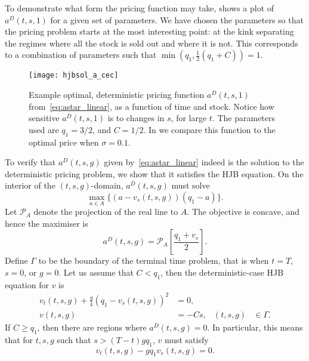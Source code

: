 \documentclass[main.tex]{subfiles}
\begin{document}
\begin{example}\label{ex:acecplot}
  To demonstrate what form the pricing function may take,
   shows a plot of $a^D(t,s,1)$ for a given set of
  parameters. We have chosen the parameters so that the pricing
  problem starts at the most interesting point: at the kink separating
  the regimes where all the stock is sold out and where it is not.
  This corresponds to a combination of parameters such that
  $\min(q_1,\frac{1}{2}(q_1+C))=1$.

  \begin{figure}[htbp]
    \centering
    \texttt{[image: hjbsol\_a\_cec]}
    \caption*{$a^D(t,s,1)$}
    \caption[Example optimal, deterministic pricing function]{Example optimal, deterministic pricing function $a^D(t,s,1)$
      from~\eqref{eq:astar_linear}, as a function of time and stock.
      Notice how sensitive $a^D(t,s,1)$ is to changes in $s$, for large
      $t$.
      The parameters used are $q_1=3/2$, and $C=1/2$.
      In  we compare this function to the optimal price
      when $\sigma=0.1$.
    }\label{fig:hjbsol_a_cec}
  \end{figure}
\end{example}

To verify that $a^D(t,s,g)$ given by~\eqref{eq:astar_linear} indeed is
the solution to the deterministic
pricing problem, we show that it satisfies the HJB equation.
On the interior of the $(t,s,g)$-domain, $a^D(t,s,g)$ must solve
\begin{equation}
  \max_{a\in A} \{(a-v_s(t,s,g))(q_1-a)\}.
\end{equation}
Let $\mathcal{P}_A$ denote the projection of the real line to $A$. The
objective is concave, and hence the maximiser is
\begin{equation}\label{eq:astar_hjb_linear}
  a^D(t,s,g) = \mathcal{P}_A\left[\frac{q_1+v_s}{2}\right].
\end{equation}
Define $\Gamma$ to be the boundary of the terminal time problem,
that is when $t=T$, $s=0$, or $g=0$.
Let us assume that $C< q_1$, then the
deterministic-case HJB equation for $v$ is
\begin{align}\label{eq:hjb_linear}
  v_t(t,s,g)+
  \frac{g}{4}{( q_1-v_s(t,s,g))}^2
  &=0, \\%
  v(t,s,g) &= -Cs,&(t,s,g)&\in \Gamma.
\end{align}
If $C\geq q_1$, then there are regions where $a^D(t,s,g)=0$. In
particular, this means that for $t,s,g$ such that
$s>(T-t)gq_1$, $v$ must satisfy
\begin{equation}\label{eq:hjb_linear_Clarge}
  v_t(t,s,g) - gq_1v_s(t,s,g)=0.
\end{equation}
\end{document}
